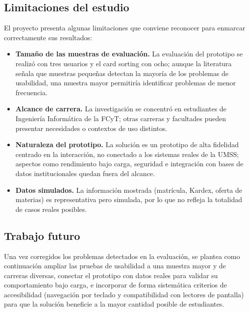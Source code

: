 \subsection*{Limitaciones del estudio}

El proyecto presenta algunas limitaciones que conviene reconocer para enmarcar correctamente sus resultados:

\begin{itemize}
  \item \textbf{Tamaño de las muestras de evaluación.} La evaluación del prototipo se realizó con tres usuarios y el card sorting con ocho; aunque la literatura señala que muestras pequeñas detectan la mayoría de los problemas de usabilidad, una muestra mayor permitiría identificar problemas de menor frecuencia.
  \item \textbf{Alcance de carrera.} La investigación se concentró en estudiantes de Ingeniería Informática de la FCyT; otras carreras y facultades pueden presentar necesidades o contextos de uso distintos.
  \item \textbf{Naturaleza del prototipo.} La solución es un prototipo de alta fidelidad centrado en la interacción, no conectado a los sistemas reales de la UMSS; aspectos como rendimiento bajo carga, seguridad e integración con bases de datos institucionales quedan fuera del alcance.
  \item \textbf{Datos simulados.} La información mostrada (matrícula, Kardex, oferta de materias) es representativa pero simulada, por lo que no refleja la totalidad de casos reales posibles.
\end{itemize}

\subsection*{Trabajo futuro}

Una vez corregidos los problemas detectados en la evaluación, se plantea como continuación ampliar las pruebas de usabilidad a una muestra mayor y de carreras diversas, conectar el prototipo con datos reales para validar su comportamiento bajo carga, e incorporar de forma sistemática criterios de accesibilidad (navegación por teclado y compatibilidad con lectores de pantalla) para que la solución beneficie a la mayor cantidad posible de estudiantes.
